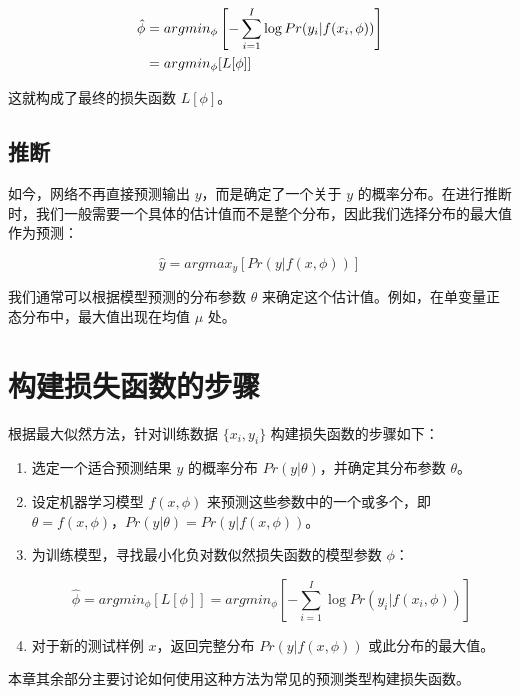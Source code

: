 \documentclass[lang=cn,newtx,10pt,scheme=chinese]{elegantbook}
\begin{document}
\begin{align}
	\hat{\phi} &= argmin_{\phi} \left[ - \sum_{i=1}^{I} \log Pr(y_i|f(x_i, \phi)) \right] \notag \\
	&= argmin_{\phi} [ L[\phi] ] 
\end{align}

这就构成了最终的损失函数 \(L[\phi]\)。

\subsection{推断}

如今，网络不再直接预测输出 \(y\)，而是确定了一个关于 \(y\) 的概率分布。在进行推断时，我们一般需要一个具体的估计值而不是整个分布，因此我们选择分布的最大值作为预测：

\begin{equation}
	\hat{y} = argmax_y [Pr(y|f(x, \phi))]  
\end{equation}

我们通常可以根据模型预测的分布参数 \(\theta\) 来确定这个估计值。例如，在单变量正态分布中，最大值出现在均值 \(\mu\) 处。

\section{构建损失函数的步骤}

根据最大似然方法，针对训练数据 \(\{x_i, y_i\}\) 构建损失函数的步骤如下：

\begin{enumerate}
\item 选定一个适合预测结果 \(y\) 的概率分布 \(Pr(y|\theta)\)，并确定其分布参数 \(\theta\)。
\item 设定机器学习模型 \(f(x, \phi)\) 来预测这些参数中的一个或多个，即 \(\theta = f(x, \phi)\)，\(Pr(y|\theta) = Pr(y|f(x, \phi))\)。
\item 为训练模型，寻找最小化负对数似然损失函数的模型参数 \(\phi\)：

\begin{equation}
	\hat{\phi} = argmin_{\phi} [ L[\phi] ] = argmin_{\phi} \left[ - \sum_{i=1}^{I} \log Pr(y_i|f(x_i, \phi)) \right] 
\end{equation}

\item 对于新的测试样例 \(x\)，返回完整分布 \(Pr(y|f(x, \phi))\) 或此分布的最大值。
\end{enumerate}

本章其余部分主要讨论如何使用这种方法为常见的预测类型构建损失函数。
\end{document}
